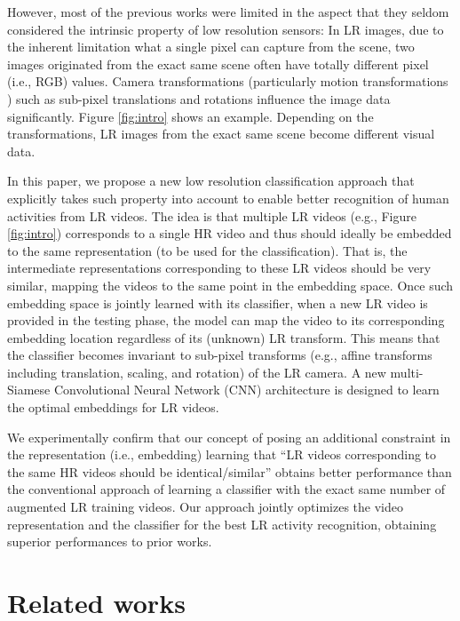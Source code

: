 \documentclass[letterpaper]{article} %
\begin{document}
However, most of the previous works were limited in the aspect that they seldom considered the intrinsic property of low resolution sensors: In LR images, due to the inherent limitation what a single pixel can capture from the scene, two images originated from the exact same scene often have totally different pixel (i.e., RGB) values. Camera transformations (particularly motion transformations \cite{huang10}) such as sub-pixel translations and rotations influence the image data significantly. Figure \ref{fig:intro} shows an example. Depending on the transformations, LR images from the exact same scene become different visual data.

In this paper, we propose a new low resolution classification approach that explicitly takes such property into account to enable better recognition of human activities from LR videos. The idea is that multiple LR videos (e.g., Figure \ref{fig:intro}) corresponds to a single HR video and thus should ideally be embedded to the same representation (to be used for the classification). That is, the intermediate representations corresponding to these LR videos should be very similar, mapping the videos to the same point in the embedding space. %
Once such embedding space is jointly learned with its classifier, when a new LR video is provided in the testing phase, the model can map the video to its corresponding embedding location regardless of its (unknown) LR transform. This means that the classifier becomes invariant to sub-pixel transforms (e.g., affine transforms including translation, scaling, and rotation) of the LR camera. A new multi-Siamese Convolutional Neural Network (CNN) architecture is designed to learn the optimal embeddings for LR videos.



We experimentally confirm that our concept of posing an additional constraint in the representation (i.e., embedding) learning that ``LR videos corresponding to the same HR videos should be identical/similar'' obtains better performance than the conventional approach of learning a classifier with the exact same number of augmented LR training videos. Our approach jointly optimizes the video representation and the classifier for the best LR activity recognition, obtaining superior performances to prior works.


\section{Related works}
\end{document}
